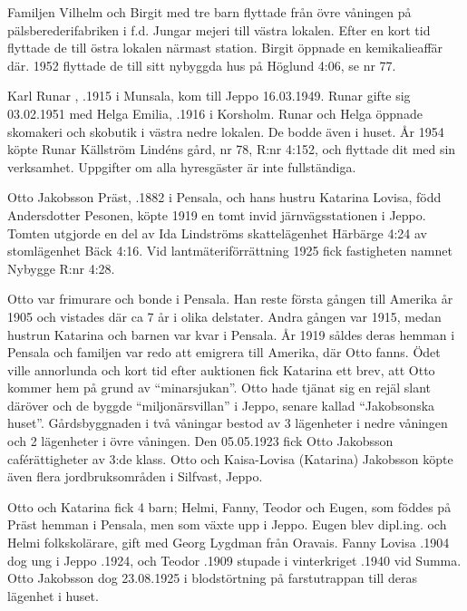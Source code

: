 Familjen Vilhelm och Birgit  med tre barn flyttade från övre våningen på pälsberederifabriken i f.d. Jungar mejeri till västra lokalen. Efter en kort tid flyttade de till östra lokalen närmast station. Birgit öppnade en kemikalieaffär där. 1952 flyttade de till sitt nybyggda hus på Höglund 4:06, se nr 77.

Karl Runar , .1915 i Munsala, kom till Jeppo 16.03.1949. Runar gifte sig 03.02.1951 med Helga Emilia, .1916 i Korsholm. Runar och Helga öppnade skomakeri och skobutik i västra nedre lokalen. De bodde även i huset. År 1954 köpte Runar Källström Lindéns gård, nr 78, R:nr 4:152, och flyttade dit med sin verksamhet.
Uppgifter om alla hyresgäster är inte fullständiga.


Otto Jakobsson Präst, .1882 i Pensala, och hans hustru Katarina Lovisa, född Andersdotter Pesonen, köpte 1919 en tomt invid järnvägsstationen i Jeppo. Tomten utgjorde en del av Ida Lindströms skattelägenhet Härbärge 4:24 av stomlägenhet Bäck 4:16. Vid lantmäteriförrättning 1925 fick fastigheten namnet Nybygge R:nr 4:28.

Otto var frimurare och bonde i Pensala. Han reste första gången till Amerika år 1905 och vistades där ca 7 år i olika delstater. Andra gången var 1915, medan hustrun Katarina och barnen var kvar i Pensala. År 1919 såldes deras hemman i Pensala och familjen var redo att emigrera till Amerika, där Otto fanns. Ödet ville annorlunda och kort tid efter auktionen fick Katarina ett brev, att Otto kommer hem på grund av ``minarsjukan''. Otto hade tjänat sig en rejäl slant däröver och de byggde ``miljonärsvillan'' i Jeppo, senare kallad ``Jakobsonska huset''.  Gårdsbyggnaden i två våningar  bestod av 3 lägenheter i nedre våningen och 2 lägenheter i övre våningen. Den 05.05.1923 fick Otto Jakobsson caférättigheter av 3:de klass. Otto och Kaisa-Lovisa (Katarina) Jakobsson köpte även flera jordbruksområden i Silfvast, Jeppo.

Otto och Katarina fick 4 barn; Helmi, Fanny, Teodor och Eugen, som föddes på Präst hemman i Pensala, men som växte upp i Jeppo. Eugen blev dipl.ing. och Helmi folkskolärare, gift med Georg Lygdman från Oravais. Fanny Lovisa .1904 dog ung i Jeppo .1924, och Teodor .1909 stupade i vinterkriget .1940 vid Summa. Otto Jakobsson dog 23.08.1925 i blodstörtning på farstutrappan till deras lägenhet i huset.



